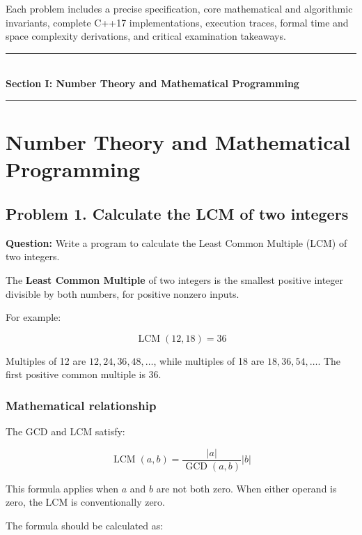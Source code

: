 Each problem includes a precise specification, core mathematical and algorithmic invariants, complete C++17 implementations, execution traces, formal time and space complexity derivations, and critical examination takeaways.


\begin{center}
\vspace{0.5em}
{\color{primary}\rule{0.45\textwidth}{1.2pt}}\\[4pt]
{\Large\bfseries\color{primary} Section I: Number Theory and Mathematical Programming}\\[2pt]
{\color{primary}\rule{0.45\textwidth}{1.2pt}}
\vspace{0.5em}
\end{center}

\section{Number Theory and Mathematical Programming}


\subsection{Problem 1. Calculate the LCM of two integers}

\textbf{Question:} Write a program to calculate the Least Common Multiple (LCM) of two integers.

The \textbf{Least Common Multiple} of two integers is the smallest positive integer divisible by both numbers, for positive nonzero inputs.

For example:


\[
\operatorname{LCM}(12,18)=36
\]


Multiples of 12 are $12,24,36,48,\ldots$, while multiples of 18 are $18,36,54,\ldots$. The first positive common multiple is 36.

\subsubsection{Mathematical relationship}

The GCD and LCM satisfy:


\[
\boxed{\operatorname{LCM}(a,b)=\frac{|a|}{\operatorname{GCD}(a,b)}|b|}
\]


This formula applies when $a$ and $b$ are not both zero. When either operand is zero, the LCM is conventionally zero.

The formula should be calculated as:


